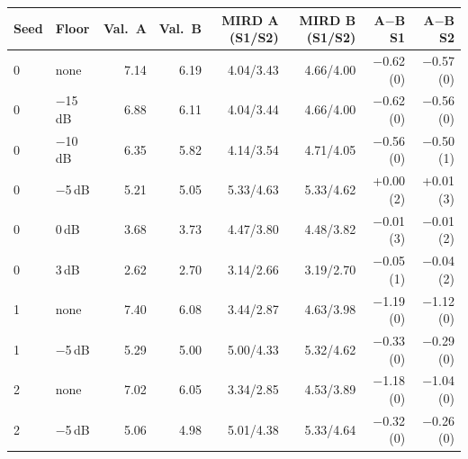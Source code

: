 \begin{tabular}{@{}llrrrrrr@{}}
\toprule
Seed & Floor & Val.\ A & Val.\ B & MIRD A (S1/S2) & MIRD B (S1/S2) & A$-$B S1 & A$-$B S2 \\
\midrule
0 & none & 7.14 & 6.19 & 4.04/3.43 & 4.66/4.00 & $-$0.62 (0) & $-$0.57 (0) \\
0 & $-$15\,dB & 6.88 & 6.11 & 4.04/3.44 & 4.66/4.00 & $-$0.62 (0) & $-$0.56 (0) \\
0 & $-$10\,dB & 6.35 & 5.82 & 4.14/3.54 & 4.71/4.05 & $-$0.56 (0) & $-$0.50 (1) \\
0 & $-$5\,dB & 5.21 & 5.05 & 5.33/4.63 & 5.33/4.62 & +0.00 (2) & +0.01 (3) \\
0 & 0\,dB & 3.68 & 3.73 & 4.47/3.80 & 4.48/3.82 & $-$0.01 (3) & $-$0.01 (2) \\
0 & 3\,dB & 2.62 & 2.70 & 3.14/2.66 & 3.19/2.70 & $-$0.05 (1) & $-$0.04 (2) \\
1 & none & 7.40 & 6.08 & 3.44/2.87 & 4.63/3.98 & $-$1.19 (0) & $-$1.12 (0) \\
1 & $-$5\,dB & 5.29 & 5.00 & 5.00/4.33 & 5.32/4.62 & $-$0.33 (0) & $-$0.29 (0) \\
2 & none & 7.02 & 6.05 & 3.34/2.85 & 4.53/3.89 & $-$1.18 (0) & $-$1.04 (0) \\
2 & $-$5\,dB & 5.06 & 4.98 & 5.01/4.38 & 5.33/4.64 & $-$0.32 (0) & $-$0.26 (0) \\
\bottomrule
\end{tabular}
